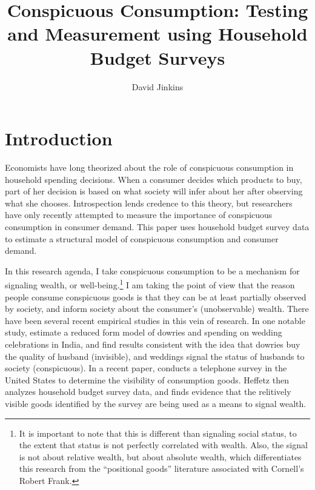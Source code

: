 \documentclass{article}
\title{Conspicuous Consumption: Testing and Measurement using Household Budget
Surveys}
\author{David Jinkins}
\begin{document}
\maketitle

\section{Introduction}
Economists have long theorized about the role of conspicuous consumption in household spending decisions.  When a consumer decides which products to buy, part of her decision is based on what society will infer about her after observing what she chooses.  Introspection lends credence to this theory, but researchers have only recently attempted to measure the importance of conspicuous consumption in consumer demand.  
This paper uses household budget survey data to estimate a structural model of conspicuous consumption and consumer demand.  

In this research agenda, I take conspicuous consumption to be a mechanism for signaling wealth, or well-being.\footnote{It is important to note that this is different than signaling social status, to the extent that status is not perfectly correlated with wealth.  Also, the signal is not about relative wealth, but about absolute wealth, which differentiates this research from the ``positional goods'' literature associated with Cornell's Robert Frank.}  I am taking the point of view that the reason people consume conspicuous goods is that they can be at least partially observed by society, and inform society about the consumer's (unobservable) wealth.  There have been several recent empirical studies in this vein of research.  In one notable study, \citet{Blochetal2004} estimate a reduced form model of dowries and spending on wedding celebrations in India, and find results consistent with the idea that dowries buy the quality of husband (invisible), and weddings signal the status of husbands to society (conspicuous).  In a recent paper, \citet{Heffetz2011} conducts a telephone survey in the United States to determine the visibility of consumption goods.  Heffetz then analyzes household budget survey data, and finds evidence that the relitively visible goods identified by the survey are being used as a means to signal wealth. 
\end{document}

